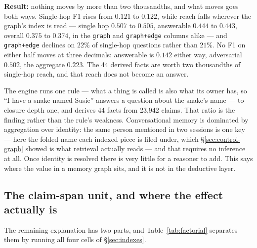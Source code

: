 \documentclass[11pt]{article}
\newcommand{\arm}[1]{\texttt{#1}}
\begin{document}
\textbf{Result:} nothing moves by more than two thousandths, and what moves goes
both ways. Single-hop F1 rises from $0.121$ to $0.122$, while reach falls
wherever the graph's index is read --- single hop $0.507$ to $0.505$, answerable
$0.444$ to $0.443$, overall $0.375$ to $0.374$, in the \arm{graph} and
\arm{graph+edge} columns alike --- and \arm{graph+edge} declines on $22\%$ of
single-hop questions rather than $21\%$. No F1 on either half moves at three
decimals: answerable is $0.142$ either way, adversarial $0.502$, the aggregate
$0.223$. The 44 derived facts are worth two thousandths of single-hop reach, and
that reach does not become an answer.

The engine runs one rule --- what a thing is called is also what its owner has,
so ``I have a snake named Susie'' answers a question about the snake's name ---
to closure depth one, and derives 44 facts from 23{,}942 claims. That ratio is
the finding rather than the rule's weakness. Conversational memory is dominated
by aggregation over identity: the same person mentioned in two sessions is one
key --- here the folded name each indexed piece is filed under, which
\S\ref{sec:control-graph} showed is what retrieval actually reads --- and that
requires no inference at all. Once identity is resolved there is very little for
a reasoner to add. This says where the value in a memory graph sits, and it is
not in the deductive layer.

\subsection{The claim-span unit, and where the effect actually is}
\label{sec:factorial}

The remaining explanation has two parts, and Table~\ref{tab:factorial} separates
them by running all four cells of \S\ref{sec:indexes}.
\end{document}
